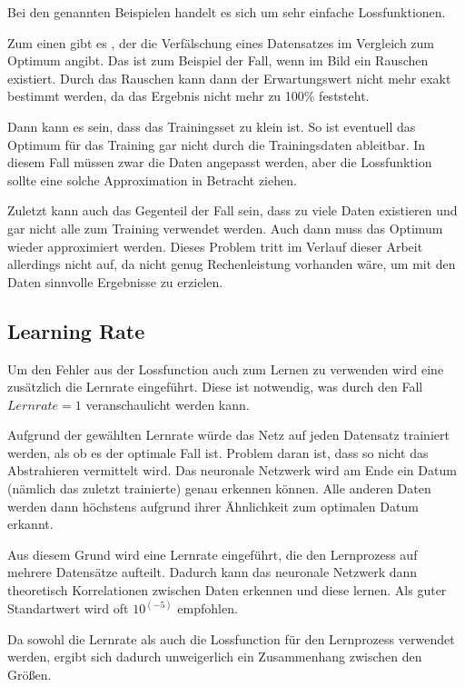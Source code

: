 Bei den genannten Beispielen handelt es sich um sehr einfache Lossfunktionen.

Zum einen gibt es , der die Verfälschung eines Datensatzes im Vergleich zum Optimum angibt.
Das ist zum Beispiel der Fall, wenn im Bild ein Rauschen existiert.
Durch das Rauschen kann dann der Erwartungswert nicht mehr exakt bestimmt werden, da das Ergebnis nicht mehr zu 100\% feststeht.
\newline

Dann kann es sein, dass das Trainingsset zu klein ist.
So ist eventuell das Optimum für das Training gar nicht durch die Trainingsdaten ableitbar.
In diesem Fall müssen zwar die Daten angepasst werden, aber die Lossfunktion sollte eine solche Approximation in Betracht  ziehen. 
\newline

Zuletzt kann auch das Gegenteil der Fall sein, dass zu viele Daten existieren und gar nicht alle zum Training verwendet werden.
Auch dann muss das Optimum wieder approximiert werden.
Dieses Problem tritt im Verlauf dieser Arbeit allerdings nicht auf, da nicht genug Rechenleistung vorhanden wäre, um mit den Daten sinnvolle Ergebnisse zu erzielen.

\subsection{Learning Rate}
Um den Fehler aus der Lossfunction auch zum Lernen zu verwenden wird eine zusätzlich die Lernrate eingeführt.
Diese ist notwendig, was durch den Fall $Lernrate = 1$ veranschaulicht werden kann.

Aufgrund der gewählten Lernrate würde das Netz auf jeden Datensatz trainiert werden, als ob es der optimale Fall ist.
Problem daran ist, dass so nicht das Abstrahieren vermittelt wird.
Das neuronale Netzwerk wird am Ende ein Datum (nämlich das zuletzt trainierte) genau erkennen können.
Alle anderen Daten werden dann höchstens aufgrund ihrer Ähnlichkeit zum optimalen Datum erkannt.
\newline

Aus diesem Grund wird eine Lernrate eingeführt, die den Lernprozess auf mehrere Datensätze aufteilt.
Dadurch kann das neuronale Netzwerk dann theoretisch Korrelationen zwischen Daten erkennen und diese lernen.
Als guter Standartwert wird oft $10^(-5)$ empfohlen. 
\newline

Da sowohl die Lernrate als auch die Lossfunction für den Lernprozess verwendet werden, ergibt sich dadurch unweigerlich ein Zusammenhang zwischen den Größen.
\newline

